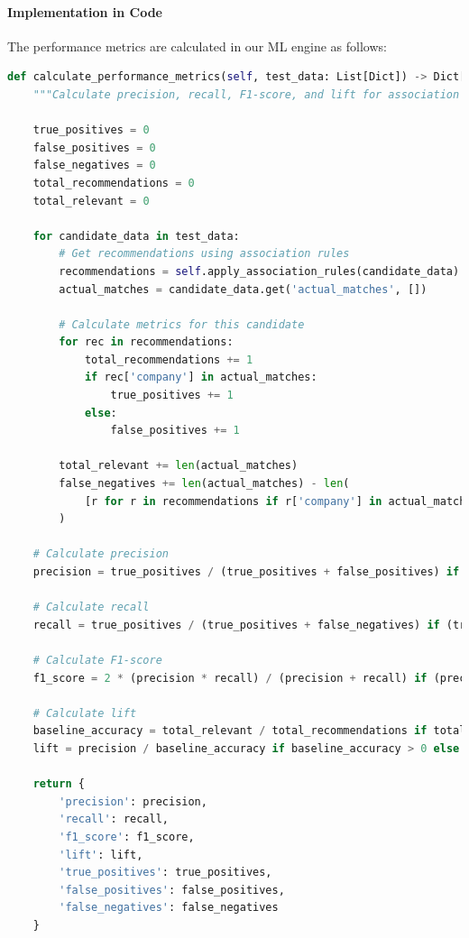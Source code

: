 \documentclass[12pt,a4paper]{article}
\begin{document}
\paragraph{Implementation in Code}

The performance metrics are calculated in our ML engine as follows:

\begin{lstlisting}[language=Python, caption=Performance Metrics Calculation Implementation]
def calculate_performance_metrics(self, test_data: List[Dict]) -> Dict[str, float]:
    """Calculate precision, recall, F1-score, and lift for association rules"""
    
    true_positives = 0
    false_positives = 0
    false_negatives = 0
    total_recommendations = 0
    total_relevant = 0
    
    for candidate_data in test_data:
        # Get recommendations using association rules
        recommendations = self.apply_association_rules(candidate_data)
        actual_matches = candidate_data.get('actual_matches', [])
        
        # Calculate metrics for this candidate
        for rec in recommendations:
            total_recommendations += 1
            if rec['company'] in actual_matches:
                true_positives += 1
            else:
                false_positives += 1
        
        total_relevant += len(actual_matches)
        false_negatives += len(actual_matches) - len(
            [r for r in recommendations if r['company'] in actual_matches]
        )
    
    # Calculate precision
    precision = true_positives / (true_positives + false_positives) if (true_positives + false_positives) > 0 else 0
    
    # Calculate recall
    recall = true_positives / (true_positives + false_negatives) if (true_positives + false_negatives) > 0 else 0
    
    # Calculate F1-score
    f1_score = 2 * (precision * recall) / (precision + recall) if (precision + recall) > 0 else 0
    
    # Calculate lift
    baseline_accuracy = total_relevant / total_recommendations if total_recommendations > 0 else 0
    lift = precision / baseline_accuracy if baseline_accuracy > 0 else 0
    
    return {
        'precision': precision,
        'recall': recall,
        'f1_score': f1_score,
        'lift': lift,
        'true_positives': true_positives,
        'false_positives': false_positives,
        'false_negatives': false_negatives
    }


\end{lstlisting}
\end{document}
